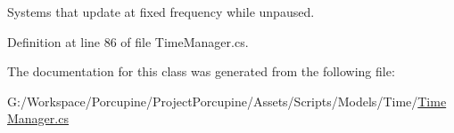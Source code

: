 Systems that update at fixed frequency while unpaused. 



Definition at line 86 of file Time\+Manager.\+cs.



The documentation for this class was generated from the following file\+:\begin{DoxyCompactItemize}
\item 
G\+:/\+Workspace/\+Porcupine/\+Project\+Porcupine/\+Assets/\+Scripts/\+Models/\+Time/\hyperlink{_time_manager_8cs}{Time\+Manager.\+cs}\end{DoxyCompactItemize}
